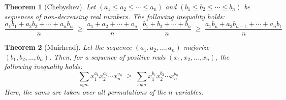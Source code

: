 \documentclass[11pt, reqno]{article}
\newtheorem{theorem}{Theorem}
\begin{document}
\begin{theorem}[Chebyshev]
Let $(a_1 \leq a_2 \leq \cdots \leq a_n)$ and $(b_1 \leq b_2 \leq \cdots \leq b_n)$ be sequences of non-decreasing real numbers.
The following inequality holds:
\begin{equation*}
	\dfrac{a_1b_1 + a_2b_2 + \cdots + a_nb_n	}{n} \;\geq\; \dfrac{a_1 + a_2 + \cdots + a_n}{n}\cdot\dfrac{b_1 + b_2 + \cdots + b_n}{n} \;\geq\;
	\dfrac{a_1b_n + a_2b_{n-1} + \cdots + a_nb_1	}{n}
\end{equation*}
\end{theorem}

\begin{theorem}[Muirhead]
Let the sequence $(a_1, a_2, \dots, a_n)$ majorize\footnotemark \, $(b_1, b_2, \dots, b_n)$.
Then, for a sequence of positive reals $(x_1, x_2, \dots, x_n)$, the following inequality holds:
\begin{equation*}
	\sum_{sym}{x_1^{a_1} x_2^{a_2} \cdots x_n^{a_n}}		\;\geq\;		\sum_{sym}{x_1^{b_1} x_2^{b_2} \cdots x_n^{b_n}}	
\end{equation*}
Here, the sums are taken over all permutations of the $n$ variables.
\end{theorem}

\vfill
{}

\break
\end{document}
